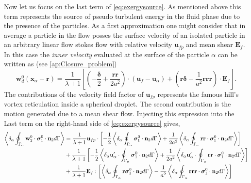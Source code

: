 Now let us focus on the last term of \ref{eq:exergysource}.
As mentioned above this term represents the source of pseudo turbulent energy in the fluid phase due to the presence of the particles. 
As a first approximation one might consider that in average a particle in the flow posses the surface velocity of an isolated particle in an arbitrary linear flow stokes flow with relative velocity  $\textbf{u}_{fp}$ and mean shear $\textbf{E}_f$.
In this case the \textit{inner velocity} evaluated at the surface of the particle $\alpha$ can be written as (see \ref{ap:Closure_problem})
\begin{equation*}
    \textbf{w}_d^0 (\textbf{x}_\alpha + \textbf{r})
    = 
    \frac{1}{\lambda +1} \left[\left(
        -\frac{\bm\delta}{2}
        + 
        \frac{\textbf{rr}}{2a^2}
    \right)\cdot (\textbf{u}_{f} - \textbf{u}_\alpha) 
    + \left(\textbf{r}\bm\delta
    -\frac{1}{a^2}\textbf{rrr}\right)\cdot \textbf{E}_f
    \right].
\end{equation*}
The contributions of the velocity field factor of $\textbf{u}_{fp}$ represents the famous hill's vortex reticulation inside a spherical droplet. 
The second contribution is the motion generated due to a mean shear flow. 
Injecting this expression into the Last term on the right-hand side of \ref{eq:exergysource} gives, 
\begin{align}
    \left<\delta_\alpha \oint_{\Gamma_{\alpha}} \textbf{w}_2^0 \cdot \bm{\sigma}_1^0\cdot\textbf{n}_2 d\Gamma\right>
    &=  
    \frac{1}{\lambda+1}\textbf{u}_{fp} \cdot \left[
        -\frac{1}{2}\left<\delta_\alpha \oint_{\Gamma_{\alpha}}  \bm{\sigma}_1^0\cdot\textbf{n}_2 d\Gamma\right>
        + \frac{1}{2a^2}
        \left<\delta_\alpha \oint_{\Gamma_{\alpha}} \textbf{rr}\cdot \bm{\sigma}_1^0\cdot\textbf{n}_2 d\Gamma\right>
    \right]\nonumber
    \\
    &+ \frac{1}{\lambda+1} \left[
        -\frac{1}{2}
        \left<\delta_\alpha \textbf{u}_\alpha' \cdot  \oint_{\Gamma_{\alpha}} \bm{\sigma}_1^0\cdot\textbf{n}_2 d\Gamma\right>
        + \frac{1}{2a^2}
        \left<\delta_\alpha \textbf{u}_\alpha' \cdot \oint_{\Gamma_{\alpha}} \textbf{rr}\cdot \bm{\sigma}_1^0\cdot\textbf{n}_2 d\Gamma\right>
    \right] \nonumber
    \\
    &+ \frac{1}{\lambda + 1} \textbf{E}_{f} : \left[ 
         \left<\delta_\alpha \oint_{\Gamma_{\alpha}} \textbf{r} \bm{\sigma}_1^0\cdot\textbf{n}_2 d\Gamma\right>
         -\frac{1}{a^2} 
         \left<\delta_\alpha \oint_{\Gamma_{\alpha}}  \textbf{rrr} \cdot \bm{\sigma}_1^0\cdot\textbf{n}_2 d\Gamma\right>
         \right]
    \label{eq:energy_term}
\end{align}
